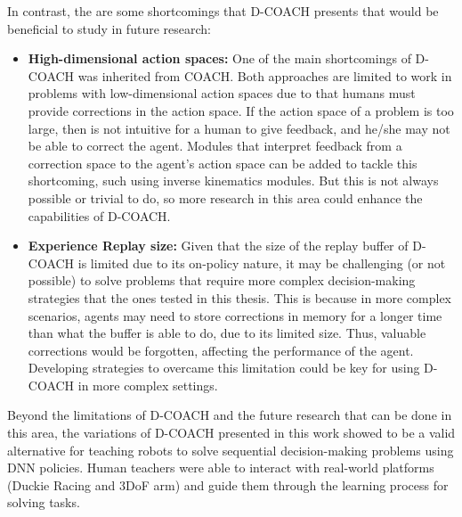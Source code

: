 In contrast, the are some shortcomings that D-COACH presents that would be beneficial to study in future research:
\begin{itemize}
    \item \textbf{High-dimensional action spaces:} One of the main shortcomings of D-COACH was inherited from COACH. Both approaches are limited to work in problems with low-dimensional action spaces due to that humans must provide corrections in the action space. If the action space of a problem is too large, then is not intuitive for a human to give feedback, and he/she may not be able to correct the agent. Modules that interpret feedback from a correction space to the agent's action space can be added to tackle this shortcoming, such using inverse kinematics modules. But this is not always possible or trivial to do, so more research in this area could  enhance the capabilities of D-COACH.
    \item \textbf{Experience Replay size:} Given that the size of the replay buffer of D-COACH is limited due to its on-policy nature, it may be challenging (or not possible) to solve problems that require more complex decision-making strategies that the ones tested in this thesis. This is because in more complex scenarios, agents may need to store corrections in memory for a longer time than what the buffer is able to do, due to its limited size. Thus, valuable corrections would be forgotten, affecting the performance of the agent. Developing strategies to overcame this limitation could be key for using D-COACH in more complex settings. 
\end{itemize}

Beyond the limitations of D-COACH and the future research that can be done in this area, the variations of D-COACH presented in this work showed to be a valid alternative for teaching robots to solve sequential decision-making problems using DNN policies. Human teachers were able to interact with real-world platforms (Duckie Racing and 3DoF arm) and guide them through the learning process for solving tasks.